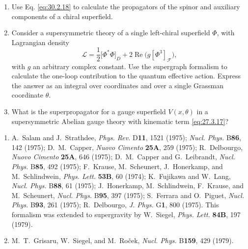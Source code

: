 

\begin{enumerate}
  \item Use Eq. \eqref{eq:30.2.18} to calculate the propagators of the
  spinor and auxiliary components of a chiral superfield.

  \item Consider a supersymmetric theory of a single left-chiral
  superfield $\Phi$, with Lagrangian density
  \[
    \mathcal{L}
    = \frac{1}{2}\bigl[\Phi^*\Phi\bigr]_D
      +2\operatorname{Re}\bigl(g[\Phi^3]_{\mathcal{F}}\bigr),
  \]
  with $g$ an arbitrary complex constant. Use the supergraph formalism
  to calculate the one-loop contribution to the quantum effective
  action. Express the answer as an integral over coordinates and over a
  single Grassman coordinate $\theta$.

  \item What is the superpropagator for a gauge superfield $V(x,\theta)$
  in a supersymmetric Abelian gauge theory with kinematic term
  \eqref{eq:27.3.17}?
\end{enumerate}


\begin{enumerate}
  \item {}\label{ch30-ref-1}
  A.~Salam and J.~Strathdee, \textit{Phys. Rev.} D\textbf{11}, 1521
  (1975); \textit{Nucl. Phys.} B\textbf{86}, 142 (1975); D.~M.~Capper,
  \textit{Nuovo Cimento} \textbf{25A}, 259 (1975); R.~Delbourgo,
  \textit{Nuovo Cimento} \textbf{25A}, 646 (1975); D.~M.~Capper and
  G.~Leibrandt, \textit{Nucl. Phys.} B\textbf{85}, 492 (1975);
  F.~Krause, M.~Scheunert, J.~Honerkamp, and M.~Schlindwein,
  \textit{Phys. Lett.} \textbf{53B}, 60 (1974); K.~Fujikawa and
  W.~Lang, \textit{Nucl. Phys.} B\textbf{88}, 61 (1975); J.~Honerkamp,
  M.~Schlindwein, F.~Krause, and M.~Scheunert, \textit{Nucl. Phys.}
  B\textbf{95}, 397 (1975); S.~Ferrara and O.~Piguet,
  \textit{Nucl. Phys.} B\textbf{93}, 261 (1975); R.~Delbourgo,
  \textit{J. Phys.} G\textbf{1}, 800 (1975). This formalism was
  extended to supergravity by W.~Siegel, \textit{Phys. Lett.}
  \textbf{84B}, 197 (1979).

  \item {}\label{ch30-ref-2}
  M.~T.~Grisaru, W.~Siegel, and M.~Ro\v{c}ek,
  \textit{Nucl. Phys.} B\textbf{159}, 429 (1979).
\end{enumerate}
